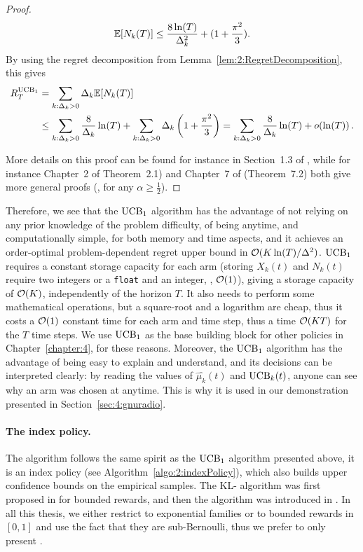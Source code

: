 \begin{proof}
    \begin{align*}
        \mathbb{E}[N_k(T)] \leq \frac{8 \ln(T)}{\Delta_k^2} + (1 + \frac{\pi^2}{3}).
    \end{align*}
    By using the regret decomposition from Lemma~\ref{lem:2:RegretDecomposition}, this gives
    \begin{align*}
        R_T^{\mathrm{UCB}_1} &= \sum_{k: \Delta_k>0} \Delta_k \mathbb{E}[N_k(T)] \\
        & \leq \sum_{k: \Delta_k>0} \frac{8}{\Delta_k} \ln(T) + \sum_{k: \Delta_k>0} \Delta_k \left( 1 + \frac{\pi^2}{3} \right)
        = \sum_{k: \Delta_k>0} \frac{8}{\Delta_k} \ln(T) + \mathop{}\mathopen{}o\mathopen{}\left(\ln(T)\right).
    \end{align*}

    More details on this proof can be found for instance in Section~1.3 of \cite{Slivkins2019}, while for instance Chapter~2 of \cite{Bubeck12} Theorem~2.1) and Chapter~7 of \cite{LattimoreBanditAlgorithmsBook} (Theorem~7.2) both give more general proofs (\eg, for any $\alpha\geq\frac{1}{2}$).
\end{proof}

Therefore, we see that the $\mathrm{UCB}_1$ algorithm has the advantage of not relying on any prior knowledge of the problem difficulty, of being anytime, and computationally simple, for both memory and time aspects, and it achieves an order-optimal problem-dependent regret upper bound in $\mathcal{O}(K\ln(T)/\Delta^2)$.
%
$\mathrm{UCB}_1$ requires a constant storage capacity for each arm (storing $X_k(t)$ and $N_k(t)$ require two integers or a \texttt{float} and an integer, \ie, $\mathop{}\mathopen{}\mathcal{O}\mathopen{}\left(1\right)$), giving a storage capacity of $\mathop{}\mathopen{}\mathcal{O}\mathopen{}\left(K\right)$, independently of the horizon $T$.
It also needs to perform some mathematical operations, but a square-root and a logarithm are cheap, thus it costs a $\mathop{}\mathopen{}\mathcal{O}\mathopen{}\left(1\right)$ constant time for each arm and time step, thus a time $\mathop{}\mathopen{}\mathcal{O}\mathopen{}\left(K T\right)$ for the $T$ time steps.
%
We use $\mathrm{UCB}_1$ as the base building block for other policies in Chapter~\ref{chapter:4}, for these reasons.
Moreover, the $\mathrm{UCB}_1$ algorithm has the advantage of being easy to explain and understand, and its decisions can be interpreted clearly: by reading the values of $\widehat{\mu_k}(t)$ and $\mathrm{UCB}_k(t)$, anyone can see why an arm was chosen at anytime.
This is why it is used in our demonstration presented in Section~\ref{sec:4:gnuradio}.


\paragraph{The \klUCB{} index policy.}
%
The \klUCB{} algorithm follows the same spirit as the $\mathrm{UCB}_1$ algorithm presented above,
it is an index policy (see Algorithm~\ref{algo:2:indexPolicy}),
which also builds upper confidence bounds on the empirical samples.
The KL-\UCB{} algorithm was first proposed in \cite{Garivier11KL} for bounded rewards,
and then the \klUCB{} algorithm was introduced in \cite{KLUCBJournal}.
In all this thesis, we either restrict to exponential families or to bounded rewards in $[0,1]$ and use the fact that they are sub-Bernoulli, thus we prefer to only present \klUCB.

